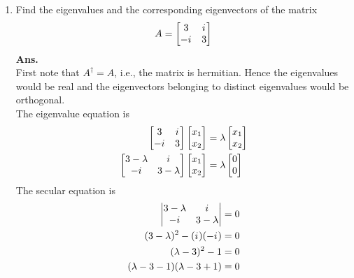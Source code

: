 \begin{enumerate}
	\item	Find the eigenvalues and the corresponding eigenvectors of the matrix
	\begin{equation}
		A = \left[
		\begin{matrix}
			3 & {i\mkern1mu} \\-{i\mkern1mu} & 3
		\end{matrix}
		\right]
	\end{equation}
	\textbf{Ans.}\\
	 First note that $A^\dagger=A$, i.e., the matrix is hermitian. Hence the eigenvalues would be real and the eigenvectors belonging to distinct eigenvalues would be orthogonal. \\
	 The eigenvalue equation is
	 \begin{eqnarray}
		 \left[\begin{matrix}
			 3 & {i\mkern1mu} \\ -{i\mkern1mu} & 3
		 \end{matrix}\right]
		 \left[\begin{matrix}
		 x_1 \\ x_2
		 \end{matrix}\right]
		 &= \lambda \left[\begin{matrix}
		 x_1 \\ x_2
		 \end{matrix}\right] \nonumber \\
		 \left[\begin{matrix}
		 3-\lambda & {i\mkern1mu} \\ -{i\mkern1mu} & 3-\lambda
		 \end{matrix}\right]
		 \left[\begin{matrix}
		 x_1 \\ x_2
		 \end{matrix}\right]
		 &= \lambda \left[\begin{matrix}
		 0 \\ 0
		 \end{matrix}\right] 
		 \label{chapter5.eqn1-example2}
	 \end{eqnarray}
	 The secular equation is
	 \begin{eqnarray}
		 \left|\begin{matrix}
		 3-\lambda & \iu \\ -\iu & 3-\lambda
		 \end{matrix}\right| &= 0 \nonumber \\
		 (3-\lambda)^2 - (\iu)(-\iu) &= 0 \nonumber \\
		 (\lambda-3)^2 - 1 &= 0 \nonumber \\
		 (\lambda - 3 - 1)(\lambda - 3 + 1) &= 0 \nonumber \\

\end{eqnarray}
\end{enumerate}
